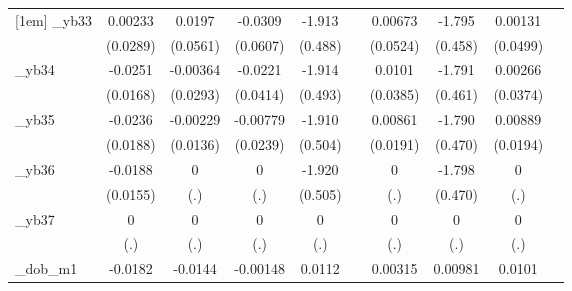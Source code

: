 \begin{table}[htbp]
\begin{tabular}{l*{9}{c}}
[1em]
\_yb33       &     0.00233         &      0.0197         &     -0.0309         &      -1.913\sym{***}&                     &     0.00673         &      -1.795\sym{***}&     0.00131         &                     \\
            &    (0.0289)         &    (0.0561)         &    (0.0607)         &     (0.488)         &                     &    (0.0524)         &     (0.458)         &    (0.0499)         &                     \\
[1em]
\_yb34       &     -0.0251         &    -0.00364         &     -0.0221         &      -1.914\sym{***}&                     &      0.0101         &      -1.791\sym{***}&     0.00266         &                     \\
            &    (0.0168)         &    (0.0293)         &    (0.0414)         &     (0.493)         &                     &    (0.0385)         &     (0.461)         &    (0.0374)         &                     \\
[1em]
\_yb35       &     -0.0236         &    -0.00229         &    -0.00779         &      -1.910\sym{***}&                     &     0.00861         &      -1.790\sym{***}&     0.00889         &                     \\
            &    (0.0188)         &    (0.0136)         &    (0.0239)         &     (0.504)         &                     &    (0.0191)         &     (0.470)         &    (0.0194)         &                     \\
[1em]
\_yb36       &     -0.0188         &           0         &           0         &      -1.920\sym{***}&                     &           0         &      -1.798\sym{***}&           0         &                     \\
            &    (0.0155)         &         (.)         &         (.)         &     (0.505)         &                     &         (.)         &     (0.470)         &         (.)         &                     \\
[1em]
\_yb37       &           0         &           0         &           0         &           0         &                     &           0         &           0         &           0         &                     \\
            &         (.)         &         (.)         &         (.)         &         (.)         &                     &         (.)         &         (.)         &         (.)         &                     \\
[1em]
\_dob\_m1     &     -0.0182         &     -0.0144         &    -0.00148         &      0.0112         &                     &     0.00315         &     0.00981         &      0.0101         &                     \\

\end{tabular}
\end{table}
